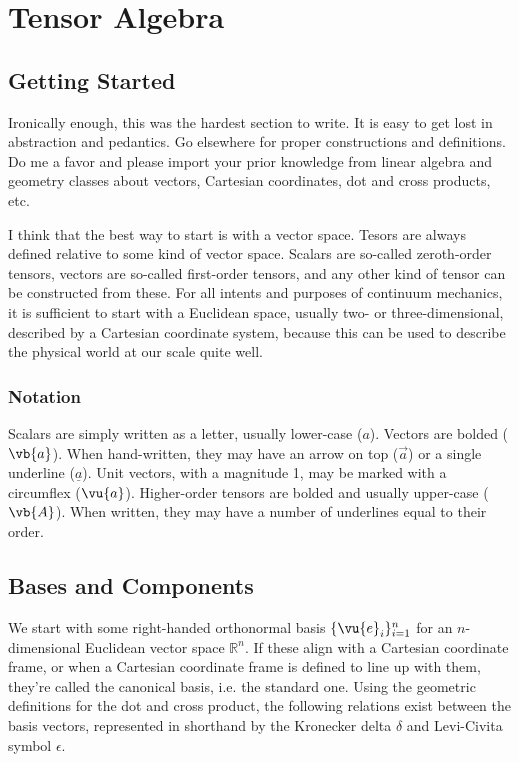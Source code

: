 \chapter{Tensor Algebra}
\label{chapter:Tensor-Algebra}


\section{Getting Started}

Ironically enough, this was the hardest section to write. It is easy to get lost in abstraction and pedantics. Go elsewhere for proper constructions and definitions. Do me a favor and please import your prior knowledge from linear algebra and geometry classes about vectors, Cartesian coordinates, dot and cross products, etc.

I think that the best way to start is with a vector space. Tesors are always defined relative to some kind of vector space. Scalars are so-called zeroth-order tensors, vectors are so-called first-order tensors, and any other kind of tensor can be constructed from these. For all intents and purposes of continuum mechanics, it is sufficient to start with a Euclidean space, usually two- or three-dimensional, described by a Cartesian coordinate system, because this can be used to describe the physical world at our scale quite well.

\subsection{Notation}

Scalars are simply written as a letter, usually lower-case ($a$). Vectors are bolded ($\vb{a}$). When hand-written, they may have an arrow on top ($\vec{a}$) or a single underline ($\underline{a}$). Unit vectors, with a magnitude 1, may be marked with a circumflex ($\vu{a}$). Higher-order tensors are bolded and usually upper-case ($\vb{A}$). When written, they may have a number of underlines equal to their order.

\section{Bases and Components}

We start with some right-handed orthonormal basis $\{\vu{e}_{i}\}_{i = 1}^{n}$ for an $n$-dimensional Euclidean vector space $\mathbb{R}^{n}$. If these align with a Cartesian coordinate frame, or when a Cartesian coordinate frame is defined to line up with them, they're called the canonical basis, i.e. the standard one. Using the geometric definitions for the dot and cross product, the following relations exist between the basis vectors, represented in shorthand by the Kronecker delta $\delta$ and Levi-Civita symbol $\epsilon$.

